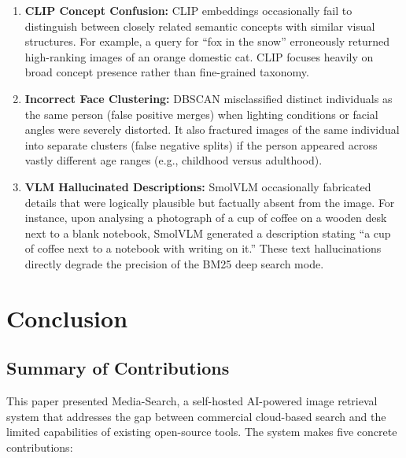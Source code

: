 \documentclass[12pt,a4paper,oneside]{report}
\begin{document}
\begin{enumerate}[leftmargin=*]
  \item \textbf{CLIP Concept Confusion:} CLIP embeddings occasionally fail to distinguish between closely related semantic concepts with similar visual structures. For example, a query for ``fox in the snow'' erroneously returned high-ranking images of an orange domestic cat. CLIP focuses heavily on broad concept presence rather than fine-grained taxonomy.

  \item \textbf{Incorrect Face Clustering:} DBSCAN misclassified distinct individuals as the same person (false positive merges) when lighting conditions or facial angles were severely distorted. It also fractured images of the same individual into separate clusters (false negative splits) if the person appeared across vastly different age ranges (e.g., childhood versus adulthood).

  \item \textbf{VLM Hallucinated Descriptions:} SmolVLM occasionally fabricated details that were logically plausible but factually absent from the image. For instance, upon analysing a photograph of a cup of coffee on a wooden desk next to a blank notebook, SmolVLM generated a description stating ``a cup of coffee next to a notebook with writing on it.'' These text hallucinations directly degrade the precision of the BM25 deep search mode.
\end{enumerate}


\chapter{Conclusion}

\section{Summary of Contributions}

This paper presented Media-Search, a self-hosted AI-powered image retrieval system that addresses the gap between commercial cloud-based search and the limited capabilities of existing open-source tools. The system makes five concrete contributions:
\end{document}

